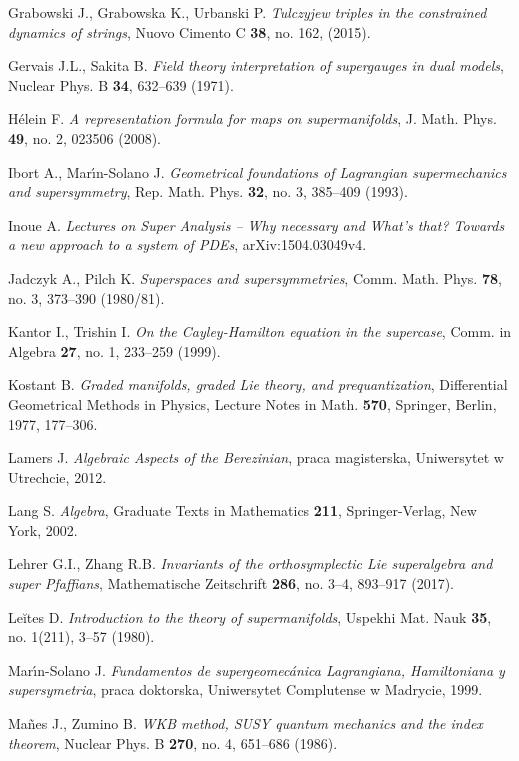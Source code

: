 \documentclass[11pt,a4paper]{report}
\theoremstyle{definition}
\begin{document}
\begin{thebibliography}{}
Grabowski J., Grabowska K., Urbanski P. \textit{Tulczyjew triples in the constrained dynamics of strings}, Nuovo Cimento C {\bf 38}, no. 162, (2015).

Gervais J.L., Sakita B. 
{\it Field theory interpretation of supergauges in dual models}, Nuclear Phys. B {\bf 34}, 632--639 (1971). 

Hélein F. \textit{A representation formula for maps on supermanifolds},  J. Math. Phys. {\bf 49}, no. 2, 023506 (2008).

Ibort A., Mar\'{\i}n-Solano J. \textit{Geometrical foundations of Lagrangian supermechanics and supersymmetry}, Rep. Math. Phys. {\bf 32}, no. 3, 385--409 (1993).


Inoue A. \textit{Lectures on Super Analysis -- Why necessary and What’s that? Towards a new approach to a system of PDEs}, arXiv:1504.03049v4.

Jadczyk A., Pilch K. \textit{Superspaces and supersymmetries}, Comm. Math. Phys. {\bf 78}, no. 3, 373--390 (1980/81).

Kantor I., Trishin I. \textit{On the Cayley-Hamilton equation in the supercase}, Comm. in Algebra {\bf 27}, no. 1, 233--259  (1999). 

Kostant B. \textit{Graded manifolds, graded Lie theory, and prequantization}, Differential Geometrical Methods in Physics, 
Lecture Notes in Math. {\bf 570}, Springer, Berlin, 1977, 177--306.

Lamers J. \textsl{Algebraic Aspects of the Berezinian}, praca magisterska, Uniwersytet w Utrechcie, 2012.

Lang S. \textsl{Algebra}, Graduate Texts in Mathematics {\bf 211}, Springer-Verlag, New York, 2002.

Lehrer G.I., Zhang R.B.
{\it Invariants of the orthosymplectic Lie superalgebra and super Pfaffians},
Mathematische Zeitschrift {\bf 286}, no. 3--4, 893--917 (2017).

Leĭtes D. \textit{Introduction to the theory of supermanifolds}, Uspekhi Mat. Nauk {\bf 35}, no. 1(211), 3--57 (1980).

Mar\'{\i}n-Solano J. {\sl Fundamentos de supergeomec\'anica Lagrangiana, Hamiltoniana y supersymetria}, praca doktorska, Uniwersytet Complutense w Madrycie, 1999.

Ma\~nes J., Zumino B. \textit{WKB method, SUSY quantum mechanics and the index theorem}, Nuclear Phys. B {\bf 270}, no. 4, 651--686 (1986).


\end{thebibliography}
\end{document}
